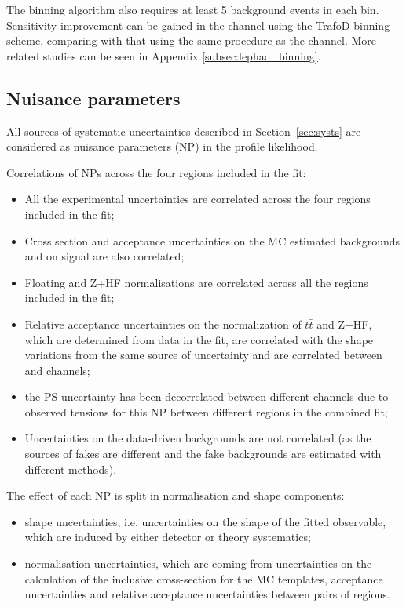 The binning algorithm also requires at least 5
background events in each bin. 
Sensitivity improvement can be gained in 
the \lephad channel using the TrafoD binning scheme, 
comparing with that using 
the same procedure as the \hadhad channel.
More related studies can be seen in Appendix \ref{subsec:lephad_binning}.


\subsection{Nuisance parameters}
\label{subsec:nuisance_parameters}

All sources of systematic uncertainties described in Section~\ref{sec:systs} are considered as nuisance parameters (NP) in the profile likelihood. 

Correlations of NPs across the four regions included in the fit:

\begin{itemize}
\item All the experimental uncertainties are correlated across the four regions included in the fit;
\item Cross section and acceptance uncertainties on the MC estimated backgrounds and on signal are also correlated;
\item Floating \ttbar and Z+HF normalisations are correlated across all the regions included in the fit;
\item Relative acceptance uncertainties on the normalization of $t\bar{t}$ and Z+HF, which are determined from data in the fit, are correlated with the shape variations from the same source of uncertainty and are correlated between \hadhad and \lephad channels;
\item the \ttbar PS uncertainty has been decorrelated between different channels due to observed tensions for this NP between different regions in the combined fit;
\item Uncertainties on the data-driven backgrounds are not correlated (as the sources of fakes are different and the fake backgrounds are estimated with different methods).
\end{itemize}

The effect of each NP is split in normalisation and shape components:

\begin{itemize}
\item shape uncertainties, i.e. uncertainties on the shape of the fitted observable, which are induced by either detector or theory systematics;
\item normalisation uncertainties, which are coming from uncertainties on the calculation of the inclusive cross-section for the MC templates, acceptance uncertainties and relative acceptance uncertainties between pairs of regions.
\end{itemize} 

